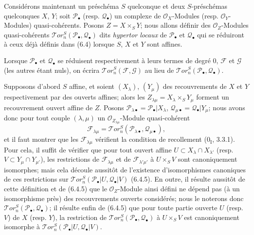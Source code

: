 \begin{env}[6.5.1]
Considérons maintenant un préschéma $S$ quelconque et deux $S$-préschémas
quelconques $X$, $Y$; soit $\mathscr P_\bullet$ (resp. $\mathscr Q_\bullet$)
un complexe de $\mathscr O_X$-Modules (resp. $\mathscr O_Y$-Modules)
quasi-cohérents. Posons $Z=X\times_S Y$; nous allons définir des
$\mathscr O_Z$-Modules quasi-cohérents
$\mathscr{T}\!or_n^S(\mathscr P_\bullet,\mathscr Q_\bullet)$ dits
\emph{hypertor locaux} de $\mathscr P_\bullet$ et $\mathscr Q_\bullet$ qui se
réduiront à ceux déjà définis dans (6.4) lorsque $S$, $X$ et $Y$ sont affines.

Lorsque $\mathscr P_\bullet$ et $\mathscr Q_\bullet$ se réduisent
respectivement à leurs termes de degré 0, $\mathscr F$ et $\mathscr G$ (les
autres étant nuls), on écrira
$\mathscr{T}\!or_n^S(\mathscr F,\mathscr G)$ au lieu de
$\mathscr{T}\!or_n^S(\mathscr P_\bullet,\mathscr Q_\bullet)$.
\end{env}

\begin{env}[6.5.2]
Supposons d'abord $S$ affine, et soient $(X_\lambda)$, $(Y_\mu)$ des
recouvrements de $X$ et $Y$ respectivement par des ouverts affines; alors les
$Z_{\lambda\mu}=X_\lambda\times_S Y_\mu$ forment un recouvrement ouvert affine
de $Z$. Posons
$\mathscr P_{\lambda\bullet}=\mathscr P_\bullet|X_\lambda$,
$\mathscr Q_{\mu\bullet}=\mathscr Q_\bullet|Y_\mu$; nous avons donc pour tout
couple $(\lambda,\mu)$ un $\mathscr O_{Z_{\lambda\mu}}$-Module quasi-cohérent
\[
  \mathscr F_{\lambda\mu}
  =\mathscr{T}\!or_n^S
   (\mathscr P_{\lambda\bullet},\mathscr Q_{\mu\bullet}),
\]
et il faut montrer que les $\mathscr F_{\lambda\mu}$ vérifient la condition de
recollement ($0_{\mathrm I}$, 3.3.1). Pour cela, il suffit de vérifier que pour
tout ouvert affine $U\subset X_\lambda\cap X_{\lambda'}$ (resp.
$V\subset Y_\mu\cap Y_{\mu'}$), les restrictions de
$\mathscr F_{\lambda\mu}$ et de $\mathscr F_{\lambda'\mu'}$ à $U\times_S V$
sont canoniquement isomorphes; mais cela découle aussitôt de l'existence
d'isomorphismes canoniques de ces restrictions sur
$\mathscr{T}\!or_n^S(\mathscr P_\bullet|U,\mathscr Q_\bullet|V)$ (6.4.5). En
outre, il résulte aussitôt de cette définition et de (6.4.5) que le
$\mathscr O_Z$-Module ainsi défini ne dépend pas (à un isomorphisme près) des
recouvrements ouverts considérés;
nous le noterons donc
$\mathscr{T}\!or_n^S(\mathscr P_\bullet,\mathscr Q_\bullet)$; il résulte enfin
de (6.4.5) que pour toute partie ouverte $U$ (resp. $V$) de $X$ (resp. $Y$), la
restriction de $\mathscr{T}\!or_n^S(\mathscr P_\bullet,\mathscr Q_\bullet)$ à
$U\times_S V$ est canoniquement isomorphe à
$\mathscr{T}\!or_n^S(\mathscr P_\bullet|U,\mathscr Q_\bullet|V)$.
\end{env}

